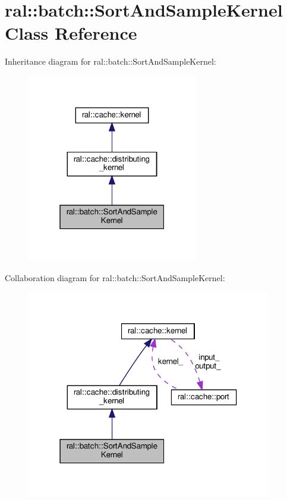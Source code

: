 \hypertarget{classral_1_1batch_1_1SortAndSampleKernel}{}\section{ral\+:\+:batch\+:\+:Sort\+And\+Sample\+Kernel Class Reference}
\label{classral_1_1batch_1_1SortAndSampleKernel}


Inheritance diagram for ral\+:\+:batch\+:\+:Sort\+And\+Sample\+Kernel\+:\nopagebreak
\begin{figure}[H]
\begin{center}
\leavevmode
\includegraphics[width=211pt]{classral_1_1batch_1_1SortAndSampleKernel__inherit__graph}
\end{center}
\end{figure}


Collaboration diagram for ral\+:\+:batch\+:\+:Sort\+And\+Sample\+Kernel\+:\nopagebreak
\begin{figure}[H]
\begin{center}
\leavevmode
\includegraphics[width=303pt]{classral_1_1batch_1_1SortAndSampleKernel__coll__graph}
\end{center}
\end{figure}
